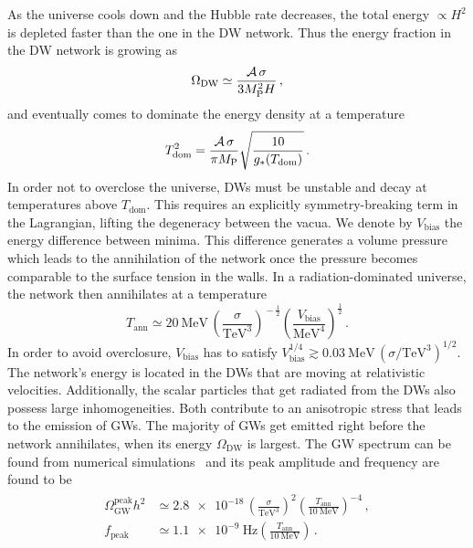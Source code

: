 \documentclass{article}
\newcommand*{\geff}{\ensuremath{g_{*}}\xspace}
\begin{document}
As the universe cools down and the Hubble rate decreases, the total energy $\propto H^2$ is depleted faster than the one in the DW network. Thus the energy fraction in the DW network is growing as
\begin{equation}
    \Omega_\mathrm{DW} \simeq \frac{\mathcal{A} \, \sigma}{3 M_{\rm P}^{2}H} \,,
\end{equation}
 and eventually comes to dominate the energy density at a temperature
\begin{equation}
    T_\mathrm{dom}^{2} = \frac{\mathcal{A}\,\sigma}{\pi M_{\rm P}}\sqrt{\frac{10}{\geff(T_\mathrm{dom})}}\,.
\end{equation}
In order not to overclose the universe, DWs must be unstable and decay at temperatures above $T_\mathrm{dom}$. This requires an explicitly symmetry-breaking term in the Lagrangian, lifting the degeneracy between the vacua. We denote by $V_\mathrm{bias}$ the energy difference between minima. This difference generates a volume pressure which leads to the annihilation of the network once the pressure becomes comparable to the surface tension in the walls. In a radiation-dominated universe, the network then annihilates at a temperature~\cite{Kawasaki:2014sqa}
\begin{equation}
    T_\mathrm{ann} \simeq \SI{20}{\MeV}\, \left(\frac{\sigma}{\si{\TeV}^3}\right)^{\!-\frac{1}{2}} \left(\frac{V_\mathrm{bias}}{\si{\MeV}^4} \right)^{\frac{1}{2}}\,.
    \label{eqn:DW_tann}
\end{equation}
 In order to avoid overclosure, $V_\mathrm{bias}$ has to satisfy
$
V_\mathrm{bias}^{1/4} \gtrsim \SI{0.03}{\MeV}\,\left(\sigma/{\si{\TeV}}^{3} \right)^{1/2}$. 
%
The network's energy is located in the DWs that are moving at relativistic velocities. Additionally, the scalar particles that get radiated from the DWs also possess large inhomogeneities. Both contribute to an anisotropic stress that leads to the emission of GWs. The majority of GWs get emitted right before the network annihilates, when its energy $\Omega_\mathrm{DW}$ is largest. The GW spectrum can be found from numerical simulations~\cite{Saikawa:2017hiv} and its peak amplitude and frequency are found to be
\begin{align}\begin{aligned}\label{eq:DWGW}
    \Omega_\mathrm{GW}^\mathrm{peak}h^2
    & \simeq \num{2.8e-18} \, \left(\frac{\sigma}{\si{\TeV}^3} \right)^2 \left(\frac{T_\mathrm{ann}}{\SI{10}{\MeV}} \right)^{-4} \,,\\
    f_{\mathrm{peak}} & \simeq \SI{1.1e-9}{\Hz} \left(\frac{T_\mathrm{ann}}{\SI{10}{\MeV}} \right)\,.
\end{aligned}\end{align}
\end{document}

